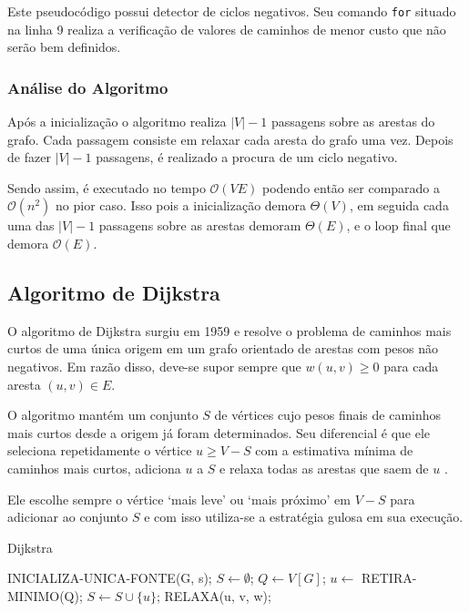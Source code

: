 \documentclass[12pt]{article}
\begin{document}
Este pseudocódigo possui detector de ciclos negativos. Seu comando \texttt{for} situado na linha 9 realiza a verificação de valores de caminhos de menor custo que não serão bem definidos.


\subsubsection{Análise do Algoritmo}

Após a inicialização o algoritmo realiza $|V| - 1$ passagens sobre as arestas do grafo. Cada passagem consiste em relaxar cada aresta do grafo uma vez. Depois de fazer $|V| - 1$ passagens, é realizado a procura de um ciclo negativo.

Sendo assim, é executado no tempo $\mathcal{O}(VE)$ podendo então ser comparado a $\mathcal{O}(n^2)$ no pior caso. Isso pois a inicialização demora $\Theta(V)$, em seguida cada uma das $|V| - 1$ passagens sobre as arestas demoram $\Theta(E)$, e o loop final que demora $\mathcal{O}(E)$.



\subsection{Algoritmo de Dijkstra} \label{sec:firstpage}

O algoritmo de Dijkstra surgiu em 1959 e resolve o problema de caminhos mais curtos de uma única origem em um grafo orientado de arestas com pesos não negativos. Em razão disso, deve-se supor sempre que $w(u, v) \geq 0$ para cada aresta $(u,v) \in E$.

O algoritmo mantém um conjunto $S$ de vértices cujo pesos finais de caminhos mais curtos desde a origem já foram determinados. Seu diferencial é que ele seleciona repetidamente o vértice $u \geq V - S$ com a estimativa mínima de caminhos mais curtos, adiciona $u$ a $S$ e relaxa todas as arestas que saem de $u$ \cite{cormen2002algoritmos}.

Ele escolhe sempre o vértice `mais leve' ou `mais próximo' em $V - S$ para adicionar ao conjunto $S$ e com isso utiliza-se a estratégia gulosa em sua execução.

\begin{algorithm}[H]
\caption{Dijkstra}\label{alg:d}
\begin{algorithmic}[1]
	\State INICIALIZA-UNICA-FONTE(G, s);
   \State $S\gets \emptyset$;
   \State $Q\gets V[G]$;
      \State $u\gets$ RETIRA-MINIMO(Q);
      \State $S\gets S \cup \{u\}$;
	      \State RELAXA(u, v, w);
      \EndFor
   \EndWhile\label{euclidendwhile}
\EndProcedure
\end{algorithmic}
\end{algorithm}
\end{document}
